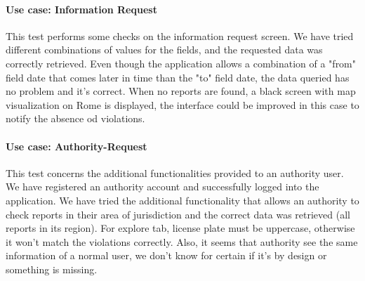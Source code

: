 \paragraph{Use case: Information Request} 
This test performs some checks on the information request screen. We have tried different combinations of values for the fields, and the requested data was correctly retrieved. Even though the application allows a combination of a "from" field date that comes later in time than the "to" field date, the data queried has no problem and it's correct. When no reports are found, a black screen with map visualization on Rome is displayed, the interface could be improved in this case to notify the absence od violations.
\paragraph{Use case: Authority-Request}
This test concerns the additional functionalities provided to an authority user. We have registered an authority account and successfully logged into the application. We have tried the additional functionality that allows an authority to check reports in their area of jurisdiction and the correct data was retrieved (all reports in its region). For explore tab, license plate must be uppercase, otherwise it won't match the violations correctly. Also, it seems that authority see the same information of a normal user, we don't know for certain if it's by design or something is missing.